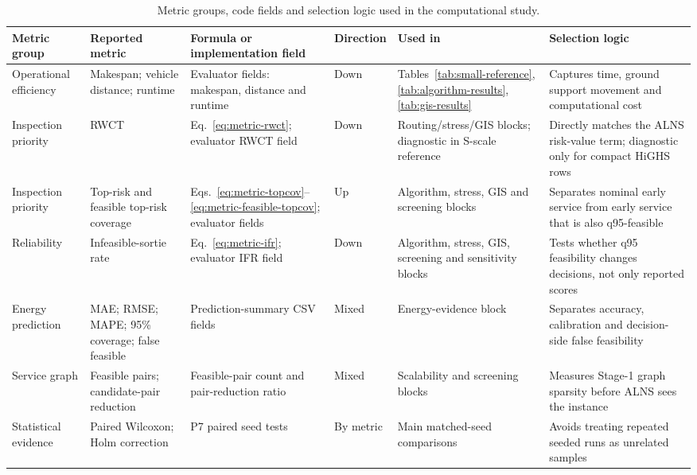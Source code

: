 \begin{table}[H]
\centering
\caption{Metric groups, code fields and selection logic used in the computational study.}
\label{tab:metric-design}
\small
\setlength{\tabcolsep}{2.2pt}
\renewcommand{\arraystretch}{1.08}
\begin{tabularx}{\textwidth}{@{}>{\raggedright\arraybackslash}p{}>{\raggedright\arraybackslash}p{}>{\raggedright\arraybackslash}p{}>{\centering\arraybackslash}p{}>{\raggedright\arraybackslash}p{}>{\raggedright\arraybackslash}X@{}}
\toprule
Metric group & Reported metric & Formula or implementation field & Direction & Used in & Selection logic \\
\midrule
Operational efficiency & Makespan; vehicle distance; runtime & Evaluator fields: makespan, distance and runtime & Down & Tables~\ref{tab:small-reference}, \ref{tab:algorithm-results}, \ref{tab:gis-results} & Captures time, ground support movement and computational cost \\
Inspection priority & RWCT & Eq.~\eqref{eq:metric-rwct}; evaluator RWCT field & Down & Routing/stress/GIS blocks; diagnostic in S-scale reference & Directly matches the ALNS risk-value term; diagnostic only for compact HiGHS rows \\
Inspection priority & Top-risk and feasible top-risk coverage & Eqs.~\eqref{eq:metric-topcov}--\eqref{eq:metric-feasible-topcov}; evaluator fields & Up & Algorithm, stress, GIS and screening blocks & Separates nominal early service from early service that is also q95-feasible \\
Reliability & Infeasible-sortie rate & Eq.~\eqref{eq:metric-ifr}; evaluator IFR field & Down & Algorithm, stress, GIS, screening and sensitivity blocks & Tests whether q95 feasibility changes decisions, not only reported scores \\
Energy prediction & MAE; RMSE; MAPE; 95\% coverage; false feasible & Prediction-summary CSV fields & Mixed & Energy-evidence block & Separates accuracy, calibration and decision-side false feasibility \\
Service graph & Feasible pairs; candidate-pair reduction & Feasible-pair count and pair-reduction ratio & Mixed & Scalability and screening blocks & Measures Stage-1 graph sparsity before ALNS sees the instance \\
Statistical evidence & Paired Wilcoxon; Holm correction & P7 paired seed tests \citep{wilcoxon1945individual,holm1979simple} & By metric & Main matched-seed comparisons & Avoids treating repeated seeded runs as unrelated samples \\
\bottomrule
\end{tabularx}
\end{table}
